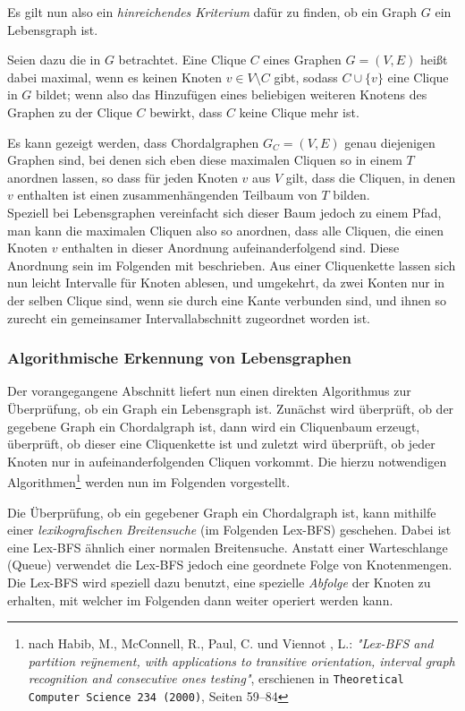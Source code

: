 Es gilt nun also ein \emph{hinreichendes Kriterium} dafür zu finden, ob ein Graph $G$ ein Lebensgraph ist.

Seien dazu die  in $G$ betrachtet. Eine Clique $C$ eines Graphen $G = (V,E)$ heißt dabei maximal, wenn es keinen Knoten $v \in V\setminus C$ gibt, sodass $C \cup \{ v \}$ eine Clique in $G$ bildet; wenn also das Hinzufügen eines beliebigen weiteren Knotens des Graphen zu der Clique $C$ bewirkt, dass $C$ keine Clique mehr ist.

Es kann gezeigt werden, dass Chordalgraphen $G_C = (V,E)$ genau diejenigen Graphen sind, bei denen sich eben diese maximalen Cliquen so in einem  $T$ anordnen lassen, so dass für jeden Knoten $v$ aus $V$ gilt, dass die Cliquen, in denen $v$ enthalten ist einen zusammenhängenden Teilbaum von $T$ bilden.\\
Speziell bei Lebensgraphen vereinfacht sich dieser Baum jedoch zu einem Pfad, man kann die maximalen Cliquen also so anordnen, dass alle Cliquen, die einen Knoten $v$ enthalten in dieser Anordnung aufeinanderfolgend sind. Diese Anordnung sein im Folgenden mit  beschrieben. Aus einer Cliquenkette lassen sich nun leicht Intervalle für Knoten ablesen, und umgekehrt, da zwei Konten nur in der selben Clique sind, wenn sie durch eine Kante verbunden sind, und ihnen so zurecht ein gemeinsamer Intervallabschnitt zugeordnet worden ist.

\subsubsection{Algorithmische Erkennung von Lebensgraphen}

Der vorangegangene Abschnitt liefert nun einen direkten Algorithmus zur Überprüfung, ob ein Graph ein Lebensgraph ist. Zunächst wird überprüft, ob der gegebene Graph ein Chordalgraph ist, dann wird ein Cliquenbaum erzeugt, überprüft, ob dieser eine Cliquenkette ist und zuletzt wird überprüft, ob jeder Knoten nur in aufeinanderfolgenden Cliquen vorkommt. Die hierzu notwendigen Algorithmen\footnote{nach Habib, M., McConnell, R., Paul, C. und Viennot , L.: \textit{"Lex-BFS and partition reÿnement, with applications to transitive orientation, interval graph recognition and consecutive ones testing"}, erschienen in \texttt{Theoretical Computer Science 234 (2000)}, Seiten 59–84} werden nun im Folgenden vorgestellt.

Die Überprüfung, ob ein gegebener Graph ein Chordalgraph ist, kann mithilfe einer \emph{lexikografischen Breitensuche} (im Folgenden Lex-BFS) geschehen. Dabei ist eine Lex-BFS ähnlich einer normalen Breitensuche. Anstatt einer Warteschlange (Queue) verwendet die Lex-BFS jedoch eine geordnete Folge von Knotenmengen. Die Lex-BFS wird speziell dazu benutzt, eine spezielle \emph{Abfolge} der Knoten zu erhalten, mit welcher im Folgenden dann weiter operiert werden kann.

